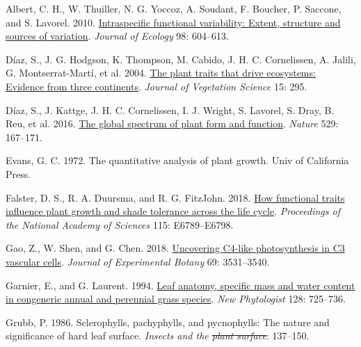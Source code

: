 \documentclass[
  12pt,
  a4paper,
,tablecaptionabove
]{scrartcl}
\newlength{\cslhangindent}
\newenvironment{CSLReferences}[2] %
 {%
  \setlength{\parindent}{0pt}
  \ifodd #1 \everypar{\setlength{\hangindent}{\cslhangindent}}\ignorespaces\fi
  \ifnum #2 > 0
  \setlength{\parskip}{#2\baselineskip}
  \fi
 }%
 {}
\providecommand{\DIFaddtex}[1]{{\protect\color{blue}\uwave{#1}}} %
\providecommand{\DIFdeltex}[1]{{\protect\color{red}\sout{#1}}}                      %
\providecommand{\DIFaddbegin}{} %
\providecommand{\DIFaddend}{} %
\providecommand{\DIFdelbegin}{} %
\providecommand{\DIFdelend}{} %
\providecommand{\DIFadd}[1]{\texorpdfstring{\DIFaddtex{#1}}{#1}} %
\providecommand{\DIFdel}[1]{\texorpdfstring{\DIFdeltex{#1}}{}} %
\newcommand{\DIFscaledelfig}{0.5}
\newlength{\DIFdelgraphicswidth} %
\newlength{\DIFdelgraphicsheight} %
\newcommand{\DIFaddincludegraphics}[2][]{{\color{blue}\fbox{\DIFOincludegraphics[#1]{#2}}}} %
\newcommand{\DIFdelincludegraphics}[2][]{%
\sbox{\DIFdelgraphicsbox}{\DIFOincludegraphics[#1]{#2}}%
\settoboxwidth{\DIFdelgraphicswidth}{\DIFdelgraphicsbox} %
\settoboxtotalheight{\DIFdelgraphicsheight}{\DIFdelgraphicsbox} %
\scalebox{\DIFscaledelfig}{%
\parbox[b]{\DIFdelgraphicswidth}{\usebox{\DIFdelgraphicsbox}\\[-\baselineskip] \rule{\DIFdelgraphicswidth}{0em}}\llap{\resizebox{\DIFdelgraphicswidth}{\DIFdelgraphicsheight}{%
\setlength{\unitlength}{\DIFdelgraphicswidth}%
\begin{picture}(1,1)%
\thicklines\linethickness{2pt} %
{\color[rgb]{1,0,0}\put(0,0){\framebox(1,1){}}}%
{\color[rgb]{1,0,0}\put(0,0){\line( 1,1){1}}}%
{\color[rgb]{1,0,0}\put(0,1){\line(1,-1){1}}}%
\end{picture}%
}\hspace*{3pt}}} %
} %
\DeclareRobustCommand{\DIFaddbegin}{\DIFOaddbegin \let\includegraphics\DIFaddincludegraphics} %
\DeclareRobustCommand{\DIFaddend}{\DIFOaddend \let\includegraphics\DIFOincludegraphics} %
\DeclareRobustCommand{\DIFdelbegin}{\DIFOdelbegin \let\includegraphics\DIFdelincludegraphics} %
\DeclareRobustCommand{\DIFdelend}{\DIFOaddend \let\includegraphics\DIFOincludegraphics} %
\begin{document}
\hypertarget{refs}{}
\begin{CSLReferences}{1}{0}
\leavevmode{}%
Albert, C. H., W. Thuiller, N. G. Yoccoz, A. Soudant, F. Boucher, P.
Saccone, and S. Lavorel. 2010.
\href{https://doi.org/10.1111/j.1365-2745.2010.01651.x}{Intraspecific
functional variability: {Extent}, structure and sources of variation}.
\emph{Journal of Ecology} 98: 604--613.

\leavevmode{}%
Díaz, S., J. G. Hodgson, K. Thompson, M. Cabido, J. H. C. Cornelissen,
A. Jalili, G. Montserrat-Martí, et al. 2004.
\href{https://doi.org/10.1658/1100-9233(2004)015\%5B0295:TPTTDE\%5D2.0.CO;2}{The
plant traits that drive ecosystems: {Evidence} from three continents}.
\emph{Journal of Vegetation Science} 15: 295.

\leavevmode{}%
Díaz, S., J. Kattge, J. H. C. Cornelissen, I. J. Wright, S. Lavorel, S.
Dray, B. Reu, et al. 2016.
\href{https://doi.org/10.1038/nature16489}{The global spectrum of plant
form and function}. \emph{Nature} 529: 167--171.

\leavevmode{}%
Evans, G. C. 1972. The quantitative analysis of plant growth. {Univ of
California Press}.

\leavevmode{}%
Falster, D. S., R. A. Duursma, and R. G. FitzJohn. 2018.
\href{https://doi.org/10.1073/pnas.1714044115}{How functional traits
influence plant growth and shade tolerance across the life cycle}.
\emph{Proceedings of the National Academy of Sciences} 115:
E6789--E6798.

\leavevmode{}%
Gao, Z., W. Shen, and G. Chen. 2018.
\href{https://doi.org/10.1093/jxb/ery155}{Uncovering {C4-like}
photosynthesis in {C3} vascular cells}. \emph{Journal of Experimental
Botany} 69: 3531--3540.

\leavevmode{}%
Garnier, E., and G. Laurent. 1994.
\href{https://doi.org/10.1111/j.1469-8137.1994.tb04036.x}{Leaf anatomy,
specific mass and water content in congeneric annual and perennial grass
species}. \emph{New Phytologist} 128: 725--736.

\leavevmode{}%
Grubb, P. 1986. Sclerophylls, pachyphylls, and pycnophylls: {The} nature
and significance of hard leaf surface. \emph{Insects and the \DIFdelbegin \DIFdel{plant
surface}\DIFdelend \DIFaddbegin \DIFadd{Plant
Surface}\DIFaddend }: 137--150.


\end{CSLReferences}
\end{document}
